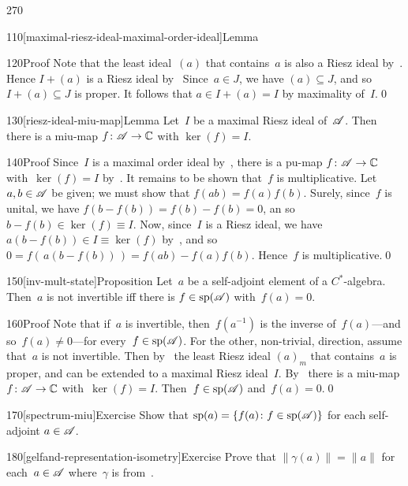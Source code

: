 \begin{parsec}{270}
\begin{point}{110}[maximal-riesz-ideal-maximal-order-ideal]{Lemma}
\begin{point}{120}{Proof}
Note that the least ideal~$(a)$ that contains~$a$
is also a Riesz ideal by~.
Hence  $I+(a)$ is a Riesz ideal by~
Since~$a\in J$, we have $(a)\subseteq J$,
and so~$I+(a)\subseteq J$ is proper.
It follows that $a\in I+(a)=I$ by maximality of~$I$.\qed
\end{point}
\end{point}
\begin{point}{130}[riesz-ideal-miu-map]{Lemma}%
Let~$I$ be a maximal Riesz ideal of~$\mathscr{A}$.
Then there is a miu-map $f\colon \mathscr{A}\to \mathbb{C}$
with $\ker(f)=I$.
\begin{point}{140}{Proof}%
Since~$I$ is a maximal order ideal 
by~,
there is a pu-map $f\colon \mathscr{A}\to \mathbb{C}$
with~$\ker(f)=I$ by~.
It remains to be shown that~$f$ is multiplicative.
Let~$a,b\in \mathscr{A}$ be given;
we must show that $f(ab)=f(a)f(b)$.
Surely, since~$f$ is unital,
we have $f(b-f(b))=f(b)-f(b)=0$,
an so $b-f(b)\in \ker(f)\equiv I$.
Now, since~$I$ is a Riesz ideal,
we have $a(b-f(b))\in I\equiv \ker(f)$ by~,
and so~$0=f(\,a(b-f(b))\,)=f(ab)-f(a)f(b)$.
Hence~$f$ is multiplicative.\qed
\end{point}
\end{point}
\begin{point}{150}[inv-mult-state]{Proposition}%
Let~$a$ be a self-adjoint element of a $C^*$-algebra.
Then~$a$ is not invertible
iff there is $f\in\mathrm{sp}(\mathscr{A})$ 
with~$f(a)=0$.
\begin{point}{160}{Proof}%
Note that if~$a$ is invertible,
then~$f(a^{-1})$ is the inverse of~$f(a)$---and so~$f(a)\neq 0$---for 
every~$f\in\mathrm{sp}(\mathscr{A})$.
For the other, non-trivial, direction,
assume that~$a$ is not invertible.
Then 
by~
the least Riesz ideal $(a)_m$
that contains~$a$ is proper,
and can be extended to a maximal Riesz ideal~$I$.
By~
there is a miu-map $f\colon \mathscr{A}\to\mathbb{C}$
with~$\ker(f)=I$.
Then~$f\in\mathrm{sp}(\mathscr{A})$
and~$f(a)=0$.\qed
\end{point}
\end{point}
\begin{point}{170}[spectrum-miu]{Exercise}%
Show that $\mathrm{sp}(a)=\{f(a)\colon f\in\mathrm{sp}(\mathscr{A})\}$
for each self-adjoint $a\in\mathscr{A}$.
\end{point}
\begin{point}{180}[gelfand-representation-isometry]{Exercise}%
Prove that $\|\gamma(a)\|=\|a\|$
for each~$a\in\mathscr{A}$
where~$\gamma$ is from~.


\end{point}
\end{parsec}
